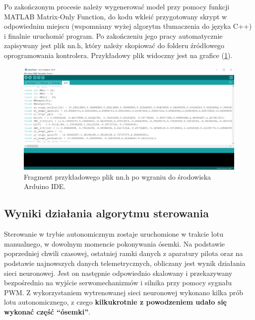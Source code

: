 \documentclass[12pt, a4paper]{article}
\let\oldref\ref
\renewcommand{\ref}[1]{(\oldref{#1})}
\begin{document}
Po zakończonym procesie należy wygenerować model przy pomocy funkcji MATLAB Matrix-Only Function, do kodu wkleić przygotowany skrypt w odpowiednim miejscu (wspomniany wyżej algorytm tłumaczenia do języka C++) i finalnie uruchomić program. Po zakończeniu jego pracy automatycznie zapisywany jest plik nn.h, który należy skopiować do folderu źródłowego oprogramowania kontrolera. Przykładowy plik widoczny jest na grafice \ref{fig:nn}.

 \begin{figure}[ht]
    \centering
    \includegraphics[width=1\textwidth]{nnh}
    \caption{Fragment przykładowego plik nn.h po wgraniu do środowiska Arduino IDE.}
    \label{fig:nn}
\end{figure}

\FloatBarrier

\subsection{Wyniki działania algorytmu sterowania}
Sterowanie w trybie autonomicznym zostaje uruchomione w trakcie lotu manualnego, w dowolnym momencie pokonywania ósemki. Na podstawie poprzedniej chwili czasowej, ostatniej ramki danych z aparatury pilota oraz na podstawie najnowszych danych telemetrycznych, obliczany jest wynik działania sieci neuronowej. Jest on następnie odpowiednio skalowany i przekazywany bezpośrednio na wyjście serwomechanizmów i silnika przy pomocy sygnału PWM. Z wykorzystaniem wytrenowanej sieci neuronowej wykonano kilka prób lotu autonomicznego, z czego \textbf{kilkukrotnie z powodzeniem udało się wykonać część ``ósemki''}. 
\end{document}
